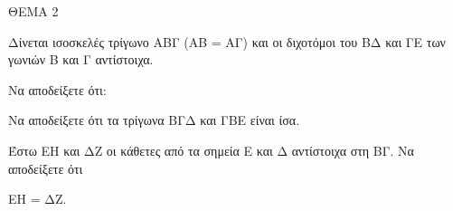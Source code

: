 
ΘΕΜΑ 2

Δίνεται ισοσκελές τρίγωνο ΑΒΓ (ΑΒ = ΑΓ) και οι διχοτόμοι του ΒΔ και ΓΕ των γωνιών Β και Γ αντίστοιχα.

Να αποδείξετε ότι:

\begin{alist}
\item Να αποδείξετε ότι τα τρίγωνα ΒΓΔ και ΓΒΕ είναι ίσα. 

\item Έστω ΕΗ και ΔΖ οι κάθετες από τα σημεία Ε και Δ αντίστοιχα στη ΒΓ. Να αποδείξετε ότι

ΕΗ = ΔΖ. 
\end{alist}
